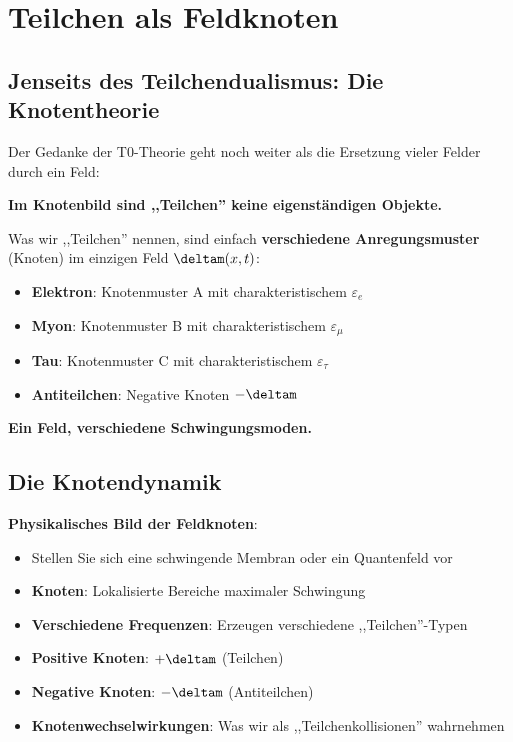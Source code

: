 	\section{Teilchen als Feldknoten}
	
	\subsection{Jenseits des Teilchendualismus: Die Knotentheorie}
	
	Der Gedanke der T0-Theorie geht noch weiter als die Ersetzung vieler Felder durch ein Feld:
	
	\begin{tcolorbox}[colback=purple!5!white,colframe=purple!75!black,title=Knotenbild: keine separaten Teilchen]
		\textbf{Im Knotenbild sind ,,Teilchen'' keine eigenständigen Objekte.}
		
		Was wir ,,Teilchen'' nennen, sind einfach \textbf{verschiedene Anregungsmuster} (Knoten) im einzigen Feld $\deltam(x,t)$:
		
		\begin{itemize}
			\item \textbf{Elektron}: Knotenmuster A mit charakteristischem $\varepsilon_e$
			\item \textbf{Myon}: Knotenmuster B mit charakteristischem $\varepsilon_{\mu}$
			\item \textbf{Tau}: Knotenmuster C mit charakteristischem $\varepsilon_{\tau}$
			\item \textbf{Antiteilchen}: Negative Knoten $-\deltam$
		\end{itemize}
		
		\textbf{Ein Feld, verschiedene Schwingungsmoden.}
	\end{tcolorbox}
	
	\subsection{Die Knotendynamik}
	
	\textbf{Physikalisches Bild der Feldknoten}:
	\begin{itemize}
		\item Stellen Sie sich eine schwingende Membran oder ein Quantenfeld vor
		\item \textbf{Knoten}: Lokalisierte Bereiche maximaler Schwingung
		\item \textbf{Verschiedene Frequenzen}: Erzeugen verschiedene ,,Teilchen''-Typen
		\item \textbf{Positive Knoten}: $+\deltam$ (Teilchen)
		\item \textbf{Negative Knoten}: $-\deltam$ (Antiteilchen)
		\item \textbf{Knotenwechselwirkungen}: Was wir als ,,Teilchenkollisionen'' wahrnehmen
	\end{itemize}
	
